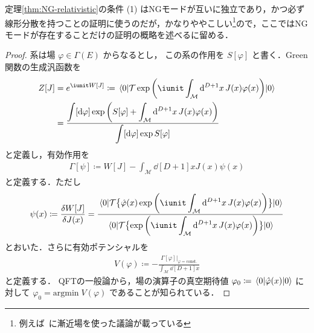 \documentclass[TQFT_main]{subfiles}
\begin{document}
定理\ref{thm:NG-relativistic}の条件 (1) はNGモードが互いに独立であり，かつ必ず線形分散を持つことの証明に使うのだが，かなりややこしい\footnote{例えば~\cite[p.7]{Kugo1989qft2}に漸近場を使った議論が載っている}ので，ここではNGモードが存在することだけの証明の概略を述べるに留める．

\begin{proof}
    系は場 $\varphi \in \Gamma(E)$ からなるとし，
    この系の作用を $S[\varphi]$ と書く．Green関数の生成汎函数を
    \begin{align}
        Z[J] &= e^{\iunit W[J]} \coloneqq \mel{0}{\mathcal{T} \exp \left( \iunit \int_{\mathcal{M}} \dd[D+1]{x} J(x) \varphi(x) \right) }{0} \\
        &= \frac{\displaystyle\int [\dd{\varphi}] \exp \left( S[\varphi] +  \int_{\mathcal{M}} \dd[D+1]{x} J(x) \varphi(x)  \right)}{\displaystyle \int [\dd{\varphi}] \exp S[\varphi]}
    \end{align}
    と定義し，有効作用を
    \begin{align}
        \Gamma[\psi] \coloneqq W[J] - \int_{\mathcal{M}} \dd[D+1]{x} J(x) \psi(x)
    \end{align}
    と定義する．ただし
    \begin{align}
        \psi(x) \coloneqq \frac{\delta W[J]}{\delta J(x)} = \frac{\displaystyle\mel{0}{\mathcal{T} \bigl\{ \hat{\varphi} (x) \exp \left( \iunit \int_{\mathcal{M}} \dd[D+1]{x} J(x) \varphi(x) \right) \bigr\}}{0}}{\displaystyle\mel{0}{\mathcal{T} \bigl\{ \exp \left( \iunit \int_{\mathcal{M}} \dd[D+1]{x} J(x) \varphi(x) \right) \bigr\}}{0}}
    \end{align}
    とおいた．さらに有効ポテンシャルを
    \begin{align}
        V(\varphi) \coloneqq - \frac{\Gamma[\varphi]|_{\varphi = \mathrm{const.}}}{\int_{\mathcal{M}} \dd[D+1]{x}}
    \end{align}
    と定義する．
    QFTの一般論から，場の演算子の真空期待値 $\varphi_0 \coloneqq \mel{0}{\hat{\varphi}(x)}{0}$ に対して $\varphi_0 = \mathrm{argmin}\;  V(\varphi)$ であることが知られている．


\end{proof}
\end{document}
